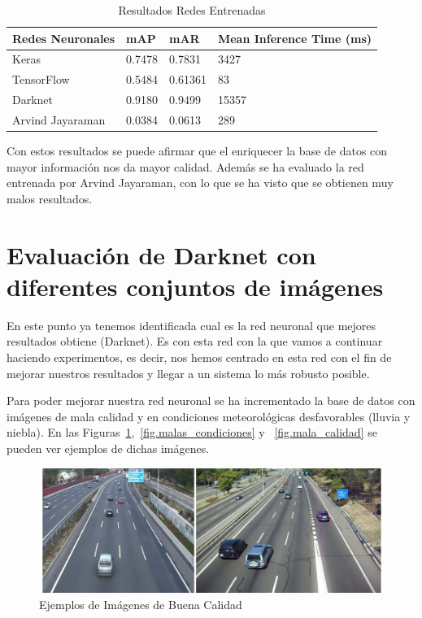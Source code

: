 \begin{table}[htbp]
\begin{center}
\begin{tabular}{|l|l|l|l|}
\hline
Redes Neuronales & mAP & mAR & Mean Inference Time (ms) \\ 
\hline \hline
Keras & 0.7478 & 0.7831 & 3427\\ \hline
TensorFlow  & 0.5484 & 0.61361 & 83 \\ \hline
Darknet  & 0.9180 & 0.9499 & 15357\\ \hline
Arvind Jayaraman & 0.0384 & 0.0613 & 289\\ \hline
\end{tabular}
\caption{Resultados Redes Entrenadas}
\label{tabla_redes_entrenadas_mayor_database}
\end{center}
\end{table}

Con estos resultados se puede afirmar que el enriquecer la base de datos con mayor información nos da mayor calidad. Además se ha evaluado la red entrenada por Arvind Jayaraman, con lo que se ha visto que se obtienen muy malos resultados.

\section{Evaluación de Darknet con diferentes conjuntos  de imágenes}

En este punto ya tenemos identificada cual es la red neuronal que mejores resultados obtiene (Darknet). Es con esta red con la que vamos a continuar haciendo experimentos, es decir, nos hemos centrado en esta red con el fin de mejorar nuestros resultados y llegar a un sistema lo más robusto posible.

Para poder mejorar nuestra red neuronal se ha incrementado la base de datos con imágenes de mala calidad y en condiciones meteorológicas desfavorables (lluvia y niebla). En las Figuras~\ref{fig.buena_calidad},~\ref{fig.malas_condiciones} y ~\ref{fig.mala_calidad} se pueden ver ejemplos de dichas imágenes.

\begin{figure}
\begin{center}
	\includegraphics[width=1\textwidth]{figures/Experimentos/buena_calidad.png}
   \caption{Ejemplos de Imágenes de Buena Calidad}
	\label{fig.buena_calidad}
\end{center}
\end{figure}

